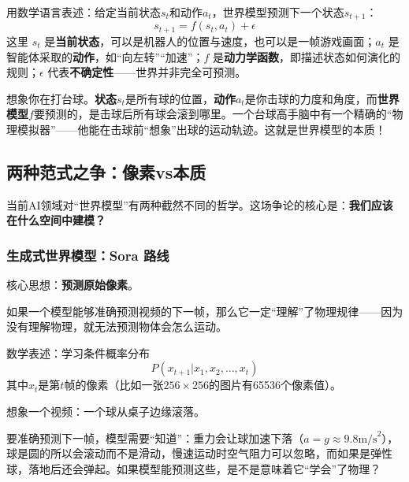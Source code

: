 用数学语言表述：给定当前状态$s_t$和动作$a_t$，世界模型预测下一个状态$s_{t+1}$：
\begin{equation}
    \boxed{s_{t+1} = f(s_t, a_t) + \epsilon}
\end{equation}
这里 $s_t$ 是\textbf{当前状态}，可以是机器人的位置与速度，也可以是一帧游戏画面；$a_t$ 是智能体采取的\textbf{动作}，如“向左转”“加速”；$f$ 是\textbf{动力学函数}，即描述状态如何演化的规则；$\epsilon$ 代表\textbf{不确定性}——世界并非完全可预测。

\begin{example}[世界模型的生活实例]
想象你在打台球。\textbf{状态}$s_t$是所有球的位置，\textbf{动作}$a_t$是你击球的力度和角度，而\textbf{世界模型}$f$要预测的，是击球后所有球会滚到哪里。一个台球高手脑中有一个精确的“物理模拟器”——他能在击球前“想象”出球的运动轨迹。这就是世界模型的本质！
\end{example}

\subsection{两种范式之争：像素vs本质}

当前AI领域对“世界模型”有两种截然不同的哲学。这场争论的核心是：\textbf{我们应该在什么空间中建模？}

\subsubsection{生成式世界模型：Sora 路线}

核心思想：\textbf{预测原始像素}。

如果一个模型能够准确预测视频的下一帧，那么它一定“理解”了物理规律——因为没有理解物理，就无法预测物体会怎么运动。

数学表述：学习条件概率分布
\begin{equation}
    P(x_{t+1} | x_1, x_2, \ldots, x_t)
\end{equation}
其中$x_t$是第$t$帧的像素（比如一张$256 \times 256$的图片有65536个像素值）。

\begin{example}[视频预测作为物理模拟]
想象一个视频：一个球从桌子边缘滚落。

要准确预测下一帧，模型需要“知道”：重力会让球加速下落（$a = g \approx 9.8 \text{m/s}^2$），球是圆的所以会滚动而不是滑动，慢速运动时空气阻力可以忽略，而如果是弹性球，落地后还会弹起。如果模型能预测这些，是不是意味着它“学会”了物理？
\end{example}

